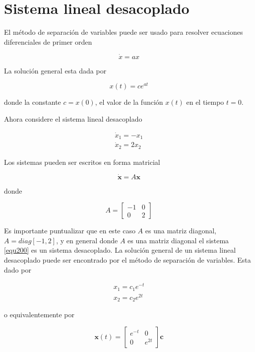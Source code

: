 \documentclass[12pt]{book}
\theoremstyle{definition}
\theoremstyle{remark}
\theoremstyle{plain}
\begin{document}
\section{Sistema lineal desacoplado}

El método de separación de variables puede ser usado para resolver ecuaciones diferenciales de primer orden

\begin{equation*}
\dot{x}= a x
\end{equation*}

La solución general esta dada por 


\begin{equation*}
x(t) = c e^{a t}
\end{equation*}

donde la constante $c=x(0)$, el valor de la función $x(t)$ en el tiempo $t=0$.

Ahora considere el sistema lineal desacoplado

\begin{align*}
\dot{x}_1 = -x_1\\
\dot{x}_2 = 2 x_2
\end{align*}

Los sistemas pueden ser escritos en forma matricial 

\begin{equation*}
\mathbf{\dot{x}}=A \mathbf{x}
\end{equation*}

donde

\begin{equation*}
A =
\begin{bmatrix}
-1 & 0\\
0 & 2
\end{bmatrix}
\end{equation*}

Es importante puntualizar que en este caso $A$ es una matriz diagonal, $A= diag[-1,2]$, y en general donde $A$ es una matriz diagonal el sistema \ref{equ200}  es un sistema desacoplado. La solución general de un sistema lineal desacoplado puede ser encontrado por el método de separación de variables. Esta dado por

 \begin{align*}
x_1 = c_1 e^{-t}\\
x_2 = c_2 e^{2 t}
\end{align*}

o equivalentemente por

\begin{equation}
\label{equ202}
\mathbf{x}(t)= \begin{bmatrix}
e^ {-t} & 0\\
0 & e^{2 t}
\end{bmatrix}
\mathbf{c}
\end{equation}
\end{document}
